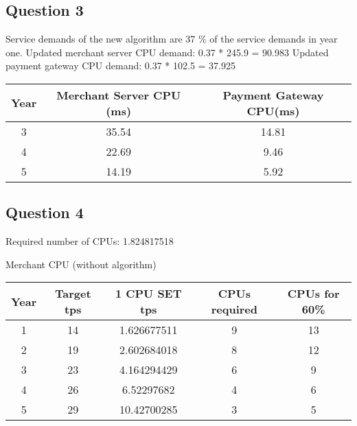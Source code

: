 \subsection{Question 3}
Service demands of the new algorithm are 37 \% of the service demands in year one.
Updated merchant server CPU demand: 0.37 * 245.9 = 90.983
Updated payment gateway CPU demand: 0.37 * 102.5 = 37.925
\begin{center}
  \begin{tabular}{ |c|c|c| }
    \hline
    Year & Merchant Server CPU (ms) & Payment Gateway CPU(ms) \\
    \hline
    3    & 35.54                    & 14.81                   \\
    \hline
    4    & 22.69                    & 9.46                    \\
    \hline
    5    & 14.19                    & 5.92                    \\
    \hline
  \end{tabular}
\end{center}

\subsection{Question 4}
Required number of CPUs: 1.824817518

\begin{center}
  Merchant CPU (without algorithm)
  \begin{tabular}{ |c|c|c|c|c| }
    \hline
    Year & Target tps & 1 CPU SET tps & CPUs required & CPUs for 60\% \\
    \hline
    1    & 14         & 1.626677511   & 9             & 13            \\
    \hline
    2    & 19         & 2.602684018   & 8             & 12            \\
    \hline
    3    & 23         & 4.164294429   & 6             & 9             \\
    \hline
    4    & 26         & 6.52297682    & 4             & 6             \\
    \hline
    5    & 29         & 10.42700285   & 3             & 5             \\
    \hline
  \end{tabular}
\end{center}

